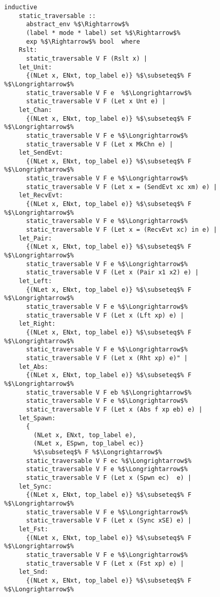 \documentclass{article}
\begin{document}
\begin{lstlisting}[style=codestyle1, escapechar=\%]
  inductive
    static_traversable ::
      abstract_env %$\Rightarrow$%
      (label * mode * label) set %$\Rightarrow$%
      exp %$\Rightarrow$% bool  where
    Rslt:
      static_traversable V F (Rslt x) |
    let_Unit:
      {(NLet x, ENxt, top_label e)} %$\subseteq$% F %$\Longrightarrow$%
      static_traversable V F e  %$\Longrightarrow$%
      static_traversable V F (Let x Unt e) |
    let_Chan:
      {(NLet x, ENxt, top_label e)} %$\subseteq$% F %$\Longrightarrow$%
      static_traversable V F e %$\Longrightarrow$%
      static_traversable V F (Let x MkChn e) |
    let_SendEvt:
      {(NLet x, ENxt, top_label e)} %$\subseteq$% F %$\Longrightarrow$%
      static_traversable V F e %$\Longrightarrow$%
      static_traversable V F (Let x = (SendEvt xc xm) e) |
    let_RecvEvt:
      {(NLet x, ENxt, top_label e)} %$\subseteq$% F %$\Longrightarrow$%
      static_traversable V F e %$\Longrightarrow$%
      static_traversable V F (Let x = (RecvEvt xc) in e) |
    let_Pair:
      {(NLet x, ENxt, top_label e)} %$\subseteq$% F %$\Longrightarrow$%
      static_traversable V F e %$\Longrightarrow$%
      static_traversable V F (Let x (Pair x1 x2) e) |
    let_Left:
      {(NLet x, ENxt, top_label e)} %$\subseteq$% F %$\Longrightarrow$%
      static_traversable V F e %$\Longrightarrow$%
      static_traversable V F (Let x (Lft xp) e) |
    let_Right:
      {(NLet x, ENxt, top_label e)} %$\subseteq$% F %$\Longrightarrow$%
      static_traversable V F e %$\Longrightarrow$%
      static_traversable V F (Let x (Rht xp) e)" |
    let_Abs:
      {(NLet x, ENxt, top_label e)} %$\subseteq$% F %$\Longrightarrow$%
      static_traversable V F eb %$\Longrightarrow$%
      static_traversable V F e %$\Longrightarrow$%
      static_traversable V F (Let x (Abs f xp eb) e) |
    let_Spawn:
      {
        (NLet x, ENxt, top_label e),
        (NLet x, ESpwn, top_label ec)}
        %$\subseteq$% F %$\Longrightarrow$%
      static_traversable V F ec %$\Longrightarrow$%
      static_traversable V F e %$\Longrightarrow$%
      static_traversable V F (Let x (Spwn ec)  e) |
    let_Sync:
      {(NLet x, ENxt, top_label e)} %$\subseteq$% F %$\Longrightarrow$%
      static_traversable V F e %$\Longrightarrow$%
      static_traversable V F (Let x (Sync xSE) e) |
    let_Fst:
      {(NLet x, ENxt, top_label e)} %$\subseteq$% F %$\Longrightarrow$%
      static_traversable V F e %$\Longrightarrow$%
      static_traversable V F (Let x (Fst xp) e) |
    let_Snd:
      {(NLet x, ENxt, top_label e)} %$\subseteq$% F %$\Longrightarrow$%

\end{lstlisting}
\end{document}
